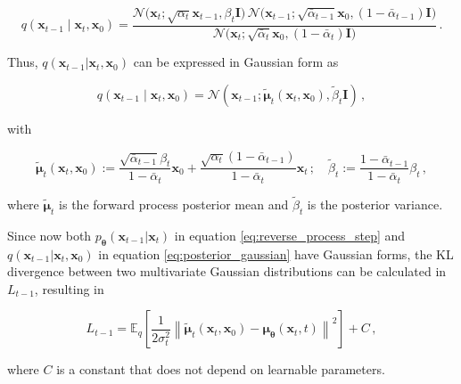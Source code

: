 \begin{equation}
q(\mathbf{x}_{t-1} \mid \mathbf{x}_t, \mathbf{x}_0) =
\frac{
\mathcal{N}\big(\mathbf{x}_t; \sqrt{\alpha_t} \mathbf{x}_{t-1}, \beta_t \mathbf{I}\big) \,
\mathcal{N}\big(\mathbf{x}_{t-1}; \sqrt{\bar{\alpha}_{t-1}} \mathbf{x}_0, (1-\bar{\alpha}_{t-1}) \mathbf{I}\big)
}{
\mathcal{N}\big(\mathbf{x}_t; \sqrt{\bar{\alpha}_t} \mathbf{x}_0, (1-\bar{\alpha}_t) \mathbf{I}\big)
} \,.
\label{eq:posterior_gaussian_expansion}
\end{equation}


Thus, $q(\mathbf{x}_{t-1}|\mathbf{x}_t,\mathbf{x}_0)$ can be expressed in Gaussian form as

\begin{equation}
q(\mathbf{x}_{t-1} \mid \mathbf{x}_t, \mathbf{x}_0) = \mathcal{N}\left(\mathbf{x}_{t-1}; \tilde{\boldsymbol{\mu}}_t\left(\mathbf{x}_t, \mathbf{x}_0\right), \tilde{\beta}_t \mathbf{I}\right) \,,
\label{eq:posterior_gaussian}
\end{equation}

with

\begin{equation}
\tilde{\boldsymbol{\mu}}_t\left(\mathbf{x}_t, \mathbf{x}_0\right) := \frac{\sqrt{\bar{\alpha}_{t-1}} \beta_t}{1-\bar{\alpha}_t} \mathbf{x}_0 + \frac{\sqrt{\alpha_t}\left(1-\bar{\alpha}_{t-1}\right)}{1-\bar{\alpha}_t} \mathbf{x}_t \,; \quad
\tilde{\beta}_t := \frac{1-\bar{\alpha}_{t-1}}{1-\bar{\alpha}_{t}}\beta_t \,,
\label{eq:posterior_mean_variance}
\end{equation}

where $\tilde{\boldsymbol{\mu}}_t$ is the forward process posterior mean and $\tilde{\beta}_t$ is the posterior variance.

Since now both $p_{\boldsymbol{\theta}}(\mathbf{x}_{t-1}|\mathbf{x}_t)$ in equation \ref{eq:reverse_process_step} and $q(\mathbf{x}_{t-1}|\mathbf{x}_t,\mathbf{x}_0)$ in equation \ref{eq:posterior_gaussian} have Gaussian forms, the KL divergence between two multivariate Gaussian distributions can be calculated in $L_{t-1}$, resulting in

\begin{equation}
    L_{t-1} = \mathbb{E}_{q}\left[\frac{1}{2\sigma_t^2}\left\|\boldsymbol{\tilde{\mu}}_{t}(\mathbf{x}_t, \mathbf{x}_0) - \boldsymbol{\mu}_{\boldsymbol{\theta}}\left(\mathbf{x}_t, t\right)\right\|^2\right] + C \,,
    \label{eq:loss_t-1}
\end{equation}

where $C$ is a constant that does not depend on learnable parameters.

